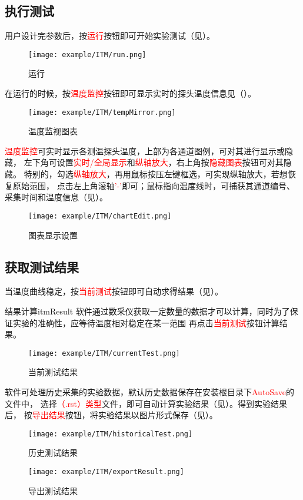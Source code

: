 \subsection{执行测试}
用户设计完参数后，按\textcolor{red}{运行}按钮即可开始实验测试（见）。
\begin{figure}[H]
	\centering
	\texttt{[image: example/ITM/run.png]}
	\caption{ 运行 \label{fig:exmp_itm_run}}
\end{figure}
在运行的时候，按\textcolor{red}{温度监控}按钮即可显示实时的探头温度信息见（）。
\begin{figure}[H]
	\centering
	\texttt{[image: example/ITM/tempMirror.png]}
	\caption{ 温度监视图表 \label{fig:exmp_itm_tempMirror}}
\end{figure}
\textcolor{red}{温度监控}可实时显示各测温探头温度，上部为各通道图例，可对其进行显示或隐藏，
左下角可设置\textcolor{red}{实时/全局显示}和\textcolor{red}{纵轴放大}，右上角按\textcolor{red}{隐藏图表}按钮可对其隐藏。
特别的，勾选\textcolor{red}{纵轴放大}，再用鼠标按压左键框选，可实现纵轴放大，若想恢复原始范围，
点击左上角滚轴\textcolor{red}{'-'}即可；鼠标指向温度线时，可捕获其通道编号、采集时间和温度信息（见）。\\
\begin{figure}[H]
	\centering
	\texttt{[image: example/ITM/chartEdit.png]}
	\caption{ 图表显示设置 \label{fig:exmp_itm_chartEdit}}
\end{figure}

\subsection{获取测试结果}
	当温度曲线稳定，按\textcolor{red}{当前测试}按钮即可自动求得结果（见）。
\begin{tips}{结果计算}{itmResult}
	软件通过数采仪获取一定数量的数据才可以计算，同时为了保证实验的准确性，应等待温度相对稳定在某一范围
再点击\textcolor{red}{当前测试}按钮计算结果。
\end{tips}
\begin{figure}[H]
	\centering
	\texttt{[image: example/ITM/currentTest.png]}
	\caption{ 当前测试结果 \label{fig:exmp_itm_currentTest}}
\end{figure}
软件可处理历史采集的实验数据，默认历史数据保存在安装根目录下\textcolor{red}{AutoSave}的文件中，
选择\textcolor{red}{（.rst）类型}文件，即可自动计算实验结果（见）。得到实验结果后，
按\textcolor{red}{导出结果}按钮，将实验结果以图片形式保存（见）。
\begin{figure}[H]
	\centering
	\texttt{[image: example/ITM/historicalTest.png]}
	\caption{ 历史测试结果 \label{fig:exmp_itm_historicalTest}}
\end{figure}

\begin{figure}[H]
	\centering
	\texttt{[image: example/ITM/exportResult.png]}
	\caption{ 导出测试结果 \label{fig:exmp_itm_exportResult}}
\end{figure}